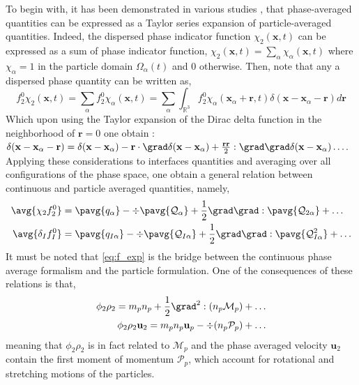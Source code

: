To begin with, it has been demonstrated in various studies \citep{nott2011suspension,jackson1997locally,zhang1994averaged}, that phase-averaged quantities can be expressed as a Taylor series expansion of particle-averaged quantities. 
Indeed, the dispersed phase indicator function $\chi_2(\textbf{x},t)$ can be expressed as a sum of phase indicator function, $\chi_2(\textbf{x},t) = \sum_\alpha\chi_\alpha(\textbf{x},t)$ where $\chi_\alpha =1$ in the particle domain $\Omega_\alpha(t)$ and $0$ otherwise. 
Then, note that any a dispersed phase quantity can be written as, 
\begin{equation*}
    f^0_2 \chi_2(\textbf{x},t)
    = \sum_\alpha f^0_2 \chi_\alpha(\textbf{x},t) 
    = \sum_\alpha \int_{\mathbb{R}^3} f^0_2 \chi_\alpha(\textbf{x}_\alpha+\textbf{r},t)\delta(\textbf{x}- \textbf{x}_\alpha - \textbf{r}) d\textbf{r} 
\end{equation*}
Which upon using the Taylor expansion of the Dirac delta function in the neighborhood of $\textbf{r}=0$ one obtain :  $\delta(\textbf{x}- \textbf{x}_\alpha - \textbf{r}) = \delta(\textbf{x}- \textbf{x}_\alpha) - \textbf{r}\cdot\grad \delta(\textbf{x} - \textbf{x}_\alpha) + \frac{\textbf{rr}}{2}:\grad\grad\delta(\textbf{x}- \textbf{x}_\alpha)\ldots $.
Applying these considerations to interfaces quantities and averaging over all configurations of the phase space, one obtain a general relation between continuous and particle averaged quantities, namely, 
\begin{align}
    \avg{\chi_2f_2^0} 
    &=  \pavg{q_\alpha}
        - \div  
        \pavg{\mathcal{Q}_\alpha}        
        + \frac{1}{2} \grad\grad : \pavg{\mathcal{Q}_{2\alpha}}
        + \ldots  
        \nonumber\\
    \avg{\delta_I f_I^0} 
    &=  \pavg{q_{I\alpha}}        
        - \div \pavg{\mathcal{Q}_{I\alpha}}
        + \frac{1}{2} \grad\grad : \pavg{\mathcal{Q}_{I\alpha}^{2}}
        + \ldots  
    \label{eq:f_exp}
\end{align}
It must be noted that \ref{eq:f_exp} is the bridge between the continuous phase average formalism and the particle formulation. 
One of the consequences of these relations is that, 
\begin{align}
    \phi_2 \rho_2
    = m_p n_p 
    + \frac{1}{2}\grad^2 : (n_p\mathcal{M}_p)+\ldots\\
    \phi_2 \rho_2 \textbf{u}_2
    = m_p n_p \textbf{u}_p 
    - \div (n_p\mathcal{P}_p)+\ldots
    \label{eq:f_exp_exe}
\end{align}
meaning that $\phi_2\rho_2$ is in fact related to $\mathcal{M}_p$ and the phase averaged velocity $\textbf{u}_2$ contain the first  moment of momentum $\mathcal{P}_p$, which account for rotational and stretching motions of the particles. 

